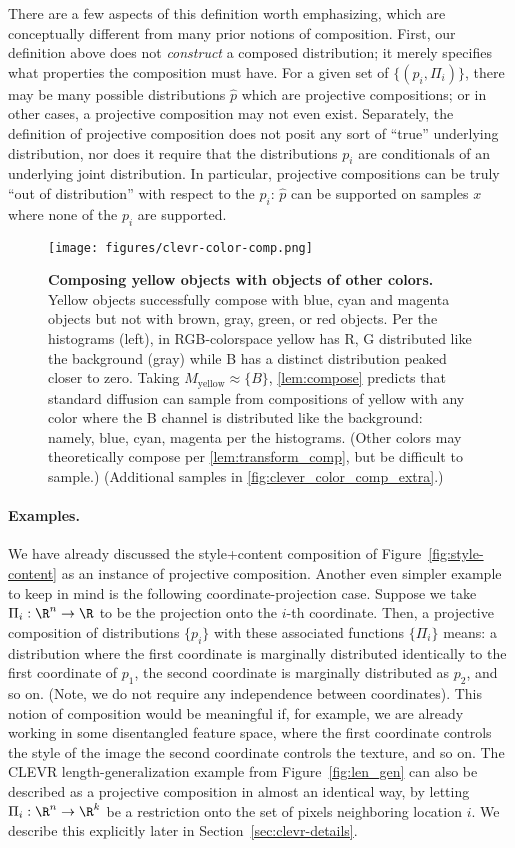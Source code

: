 There are a few aspects of this definition worth emphasizing,
which are conceptually different from 
many prior notions of composition.
First, our definition above does not \emph{construct} a composed distribution;
it merely specifies what properties the composition must have.
For a given set of $\{(p_i, \Pi_i)\}$, there may be many possible distributions $\hat{p}$
which are projective compositions; or in other cases, a projective composition
may not even exist.
Separately, the definition of projective composition does not posit any sort of ``true'' underlying
distribution, nor does it require that the distributions $p_i$ 
are conditionals of an underlying joint distribution.
In particular, projective compositions can be truly ``out of distribution'' with respect to the $p_i$: $\hat{p}$ can be
supported on samples $x$ where none of the $p_i$ are supported.
\begin{figure}[t]
    \centering
    \texttt{[image: figures/clevr-color-comp.png]}
    \caption{\textbf{Composing yellow objects with objects of other colors.} Yellow objects successfully compose with blue, cyan and magenta objects but not with brown, gray, green, or red objects. Per the histograms (left), in RGB-colorspace yellow has R, G distributed like the background (gray) while B has a distinct distribution peaked closer to zero.
    Taking $M_\text{yellow} \approx \{B\}$, \cref{lem:compose} predicts that standard diffusion can sample from compositions of yellow with any color
    where the B channel is distributed like the background: namely, blue, cyan, magenta per the histograms. (Other colors may theoretically compose per \cref{lem:transform_comp}, but be difficult to sample.) (Additional samples in \cref{fig:clever_color_comp_extra}.)}
    \label{fig:clevr_color_comp}
\end{figure}
\paragraph{Examples.}
We have already discussed the style+content composition of Figure~\ref{fig:style-content}
as an instance of projective composition.
Another even simpler example to keep in mind is 
the following coordinate-projection case.
Suppose we take $\Pi_i: \R^n \to \R$ to be the
projection onto the $i$-th coordinate.
Then, a projective composition of distributions $\{p_i\}$
with these associated functions $\{\Pi_i\}$
means: a distribution where the first coordinate is
marginally distributed identically to the first coordinate of $p_1$,
the second coordinate is marginally distributed as $p_2$, and so on.
(Note, we do not require any independence between coordinates).
This notion of composition would be meaningful if, for example,
we are already working in some disentangled feature space,
where the first coordinate controls the style of the image
the second coordinate controls the texture, and so on.
The CLEVR length-generalization example from Figure~\ref{fig:len_gen}
can also be described as a projective composition in almost an identical way,
by letting $\Pi_i: \R^n \to \R^k$ be a restriction onto the set of
pixels neighboring location $i$. We describe this 
explicitly later in Section~\ref{sec:clevr-details}.

